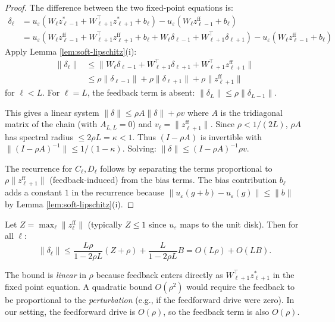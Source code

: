 \documentclass[11pt]{article}
\begin{document}
\begin{proof}
The difference between the two fixed-point equations is:
\begin{align}
  \delta_\ell &= u_\varepsilon(W_\ell z^*_{\ell-1} + W_{\ell+1}^\top z^*_{\ell+1} + b_\ell)
    - u_\varepsilon(W_\ell z^{\text{ff}}_{\ell-1} + b_\ell) \\
  &= u_\varepsilon(W_\ell z^{\text{ff}}_{\ell-1} + W_{\ell+1}^\top z^{\text{ff}}_{\ell+1} + b_\ell
    + W_\ell \delta_{\ell-1} + W_{\ell+1}^\top \delta_{\ell+1})
    - u_\varepsilon(W_\ell z^{\text{ff}}_{\ell-1} + b_\ell)
\end{align}
Apply Lemma \ref{lem:soft-lipschitz}(i):
\begin{align}
  \|\delta_\ell\|
  &\le \|W_\ell \delta_{\ell-1} + W_{\ell+1}^\top \delta_{\ell+1}
    + W_{\ell+1}^\top z^{\text{ff}}_{\ell+1}\| \\
  &\le \rho \|\delta_{\ell-1}\| + \rho \|\delta_{\ell+1}\| + \rho \|z^{\text{ff}}_{\ell+1}\|
\end{align}
for $\ell < L$. For $\ell = L$, the feedback term is absent:
$\|\delta_L\| \le \rho \|\delta_{L-1}\|$.

This gives a linear system $\|\delta\| \le \rho A \|\delta\| + \rho v$
where $A$ is the tridiagonal matrix of the chain (with $A_{L,L}=0$)
and $v_\ell = \|z^{\text{ff}}_{\ell+1}\|$. Since $\rho < 1/(2L)$,
$\rho A$ has spectral radius $\le 2\rho L = \kappa < 1$. Thus
$(I - \rho A)$ is invertible with $\|(I - \rho A)^{-1}\| \le 1/(1-\kappa)$.
Solving:
$\|\delta\| \le (I - \rho A)^{-1} \rho v$.

The recurrence for $C_\ell, D_\ell$ follows by separating the terms
proportional to $\rho \|z^{\text{ff}}_{\ell+1}\|$ (feedback-induced)
from the bias terms. The bias contribution $b_\ell$ adds a constant
$1$ in the recurrence because $\|u_\varepsilon(g+b) - u_\varepsilon(g)\|
\le \|b\|$ by Lemma \ref{lem:soft-lipschitz}(i).
\end{proof}

\begin{corollary}
Let $Z = \max_\ell \|z^{\text{ff}}_\ell\|$ (typically $Z \le 1$ since
$u_\varepsilon$ maps to the unit disk). Then for all $\ell$:
\begin{equation}
  \|\delta_\ell\| \le \frac{L\rho}{1-2\rho L} (Z + \rho) + \frac{L}{1-2\rho L} B
  = O(L\rho) + O(LB).
\end{equation}
\end{corollary}

\begin{remark}
The bound is \emph{linear} in $\rho$ because feedback enters directly
as $W_{\ell+1}^\top z_{\ell+1}^*$ in the fixed point equation. A
quadratic bound $O(\rho^2)$ would require the feedback to be
proportional to the \emph{perturbation} (e.g., if the feedforward
drive were zero). In our setting, the feedforward drive is $O(\rho)$,
so the feedback term is also $O(\rho)$.
\end{remark}
\end{document}
